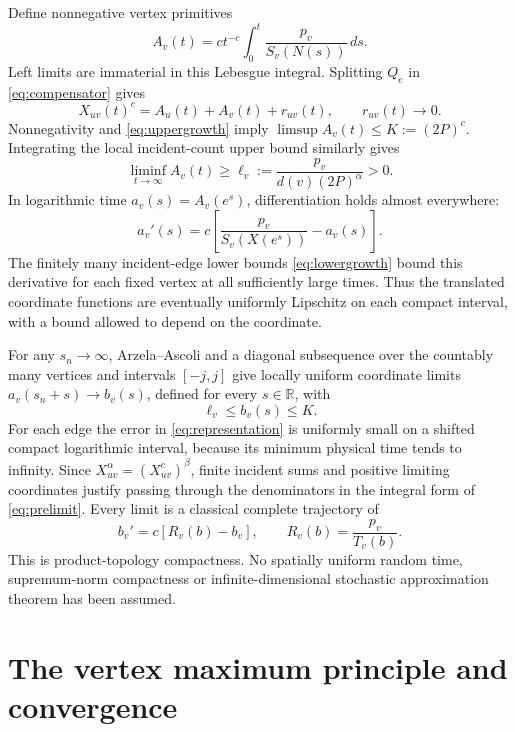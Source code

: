 \documentclass[11pt,a4paper]{article}
\newcommand{\R}{\mathbb R}
\newcommand{\Tv}{T_v}
\begin{document}
Define nonnegative vertex primitives
\[
 A_v(t)=ct^{-c}\int_0^t\frac{p_v}{S_v(N(s))}\,ds.
\]
Left limits are immaterial in this Lebesgue integral. Splitting $Q_e$ in
\eqref{eq:compensator} gives
\begin{equation}\label{eq:representation}
 X_{uv}(t)^c=A_u(t)+A_v(t)+r_{uv}(t),\qquad r_{uv}(t)\longrightarrow0.
\end{equation}
Nonnegativity and \eqref{eq:uppergrowth} imply
$\limsup A_v(t)\leq K:=(2P)^c$. Integrating the local incident-count upper
bound similarly gives
\[
 \liminf_{t\to\infty}A_v(t)\geq
 \ell_v:=\frac{p_v}{d(v)(2P)^\alpha}>0.
\]
In logarithmic time $a_v(s)=A_v(e^s)$, differentiation holds almost everywhere:
\begin{equation}\label{eq:prelimit}
 a_v'(s)=c\left[\frac{p_v}{S_v(X(e^s))}-a_v(s)\right].
\end{equation}
The finitely many incident-edge lower bounds \eqref{eq:lowergrowth} bound this
derivative for each fixed vertex at all sufficiently large times. Thus the
translated coordinate functions are eventually uniformly Lipschitz on each
compact interval, with a bound allowed to depend on the coordinate.

For any $s_n\to\infty$, Arzela--Ascoli and a diagonal subsequence over the
countably many vertices and intervals $[-j,j]$ give locally uniform coordinate
limits $a_v(s_n+s)\to b_v(s)$, defined for every $s\in\R$, with
\[
 \ell_v\leq b_v(s)\leq K.
\]
For each edge the error in \eqref{eq:representation} is uniformly small on a
shifted compact logarithmic interval, because its minimum physical time tends
to infinity. Since $X_{uv}^\alpha=(X_{uv}^c)^\beta$, finite incident sums and
positive limiting coordinates justify passing through the denominators in the
integral form of \eqref{eq:prelimit}. Every limit is a classical complete
trajectory of
\begin{equation}\label{eq:limit}
 b_v'=c\left[R_v(b)-b_v\right],\qquad
 R_v(b)=\frac{p_v}{\Tv(b)}.
\end{equation}
This is product-topology compactness. No spatially uniform random time,
supremum-norm compactness or infinite-dimensional stochastic approximation
theorem has been assumed.

\section{The vertex maximum principle and convergence}
\end{document}
